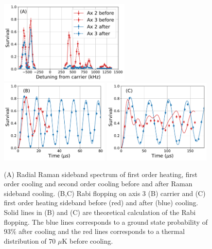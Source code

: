 \documentclass[aps,prl,twocolumn,groupedaddress]{revtex4-1}
\begin{document}
\begin{figure}
  \includegraphics[height=4.2cm]{imgs/spectrum_r.pdf}
  \includegraphics[height=4.2cm]{imgs/rabi_flop_r3_0.pdf}
  \includegraphics[height=4.2cm]{imgs/rabi_flop_r3_p1.pdf}
  \caption{(A) Radial Raman sideband spectrum of first order heating, first order cooling and
    second order cooling before and after Raman sideband cooling.
    (B,C) Rabi flopping on axis 3 (B) carrier and (C) first order heating sideband
    before (red) and after (blue) cooling.
    Solid lines in (B) and (C) are theoretical calculation of the Rabi flopping.
    The blue lines corresponds to a ground state probability of $93\%$ after cooling and
    the red lines corresponds to a thermal distribution of $70$ $\mu$K before cooling.
    \label{f-radial}}
\end{figure}
\end{document}
